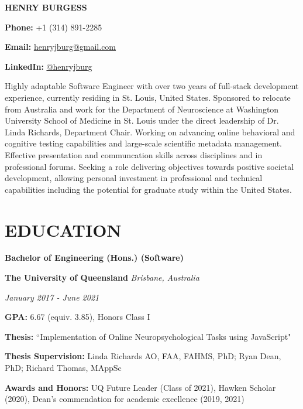 \documentclass{article}
\begin{document}
  {\Huge\textbf{\uppercase{Henry Burgess}}} \hfill \begin{minipage}{0.26\linewidth}

  \textbf{Phone:} +1 (314) 891-2285

  \textbf{Email:} \href{mailto:henryjburg@gmail.com}{\color{blue}\underline{henryjburg@gmail.com}}

  \textbf{LinkedIn:} \href{https://www.linkedin.com/in/henryjburg/}{\color{blue}\underline{@henryjburg}}

  \end{minipage}

  \medbreak

  Highly adaptable Software Engineer with over two years of full-stack development experience, currently residing in St. Louis, United States.
  Sponsored to relocate from Australia and work for the Department of Neuroscience at Washington University School of Medicine in St. Louis under the direct leadership of Dr. Linda Richards, Department Chair.
  Working on advancing online behavioral and cognitive testing capabilities and large-scale scientific metadata management. Effective presentation and communcation skills across disciplines and in professional forums.
  Seeking a role delivering objectives towards positive societal development, allowing personal investment in professional and technical capabilities including the potential for graduate study within the United States.

  \section*{\centering\uppercase{Education}}

  {\large\textbf{Bachelor of Engineering (Hons.) (Software)}}

  \medbreak

  \textbf{The University of Queensland} \hfill \textit{Brisbane, Australia}

  \textit{January 2017 - June 2021}

  \textbf{GPA:} 6.67 (equiv. 3.85), Honors Class I

  \textbf{Thesis:} ``Implementation of Online Neuropsychological Tasks using JavaScript"

  \textbf{Thesis Supervision:} Linda Richards AO, FAA, FAHMS, PhD; Ryan Dean, PhD; Richard Thomas, MAppSc

  \textbf{Awards and Honors:} UQ Future Leader (Class of 2021), Hawken Scholar (2020), Dean's commendation for academic excellence (2019, 2021)
\end{document}
